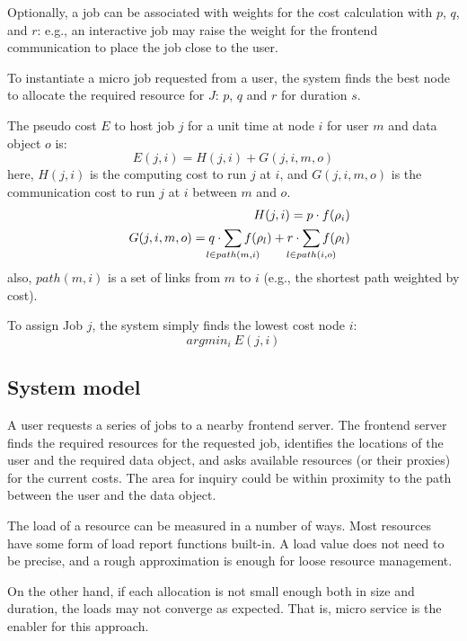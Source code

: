 Optionally, a job can be associated with weights for the cost
calculation with $p$, $q$, and $r$: e.g., an interactive job may raise
the weight for the frontend communication to place the job close to
the user.

To instantiate a micro job requested from a user, the system finds the
best node to allocate the required resource for $J$: $p$, $q$ and $r$
for duration $s$.

The pseudo cost $E$ to host job $j$ for a unit time at node $i$ for
user $m$ and data object $o$ is:
\begin{equation*}
	E(j, i)     = H(j,i) + G(j,i,m,o)
\end{equation*}
here, $H(j, i)$ is the computing cost to run $j$ at $i$, and
$G(j, i, m, o)$ is the communication cost to run $j$ at $i$
between $m$ and $o$.
\begin{eqnarray*}
&&  H(j,i)      = p \cdot f(\rho_{i}) \\
&&  G(j,i,m,o)  = q \cdot \smashoperator{\sum_{l \in path(m,i)}} f(\rho_{l}) + r \cdot \smashoperator{\sum_{l \in path(i,o)}} f(\rho_{l})
\end{eqnarray*}
also, $path(m,i)$ is a set of links from $m$ to $i$ (e.g., the
shortest path weighted by cost).

To assign Job $j$, the system simply finds the lowest cost node $i$:
\begin{equation*}
	argmin_{i} \: E(j, i)
\end{equation*}

\subsection{System model}

A user requests a series of jobs to a nearby frontend server.
The frontend server finds the required resources for the requested job,
identifies the locations of the user and the required data object,
and asks available resources (or their proxies) for the current costs.
The area for inquiry could be within proximity to the path between the
user and the data object.

The load of a resource can be measured in a number of ways.  Most
resources have some form of load report functions built-in.
A load value does not need to be precise, and a rough approximation is
enough for loose resource management.

On the other hand, if each allocation is not small enough both in size
and duration, the loads may not converge as expected.
That is, micro service is the enabler for this approach.

